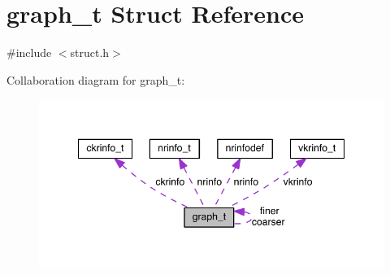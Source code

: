 \hypertarget{a00734}{}\section{graph\+\_\+t Struct Reference}
\label{a00734}


{\ttfamily \#include $<$struct.\+h$>$}



Collaboration diagram for graph\+\_\+t\+:\nopagebreak
\begin{figure}[H]
\begin{center}
\leavevmode
\includegraphics[width=348pt]{a00732}
\end{center}
\end{figure}

